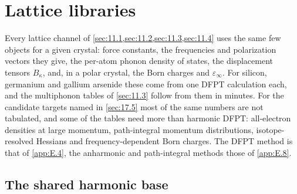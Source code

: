 \section{Lattice libraries}\label{app:E.17}

Every lattice channel of \cref{sec:11.1,sec:11.2,sec:11.3,sec:11.4} uses the same few objects for a given crystal: force constants, the frequencies and polarization vectors they give, the per-atom phonon density of states, the displacement tensors $B_\kappa$, and, in a polar crystal, the Born charges and $\varepsilon_\infty$. For silicon, germanium and gallium arsenide these come from one DFPT calculation each, and the multiphonon tables of \cref{sec:11.3} follow from them in minutes. For the candidate targets named in \cref{sec:17.5} most of the same numbers are not tabulated, and some of the tables need more than harmonic DFPT: all-electron densities at large momentum, path-integral momentum distributions, isotope-resolved Hessians and frequency-dependent Born charges. The DFPT method is that of \cref{app:E.4}, the anharmonic and path-integral methods those of \cref{app:E.8}.

\subsection{The shared harmonic base}

